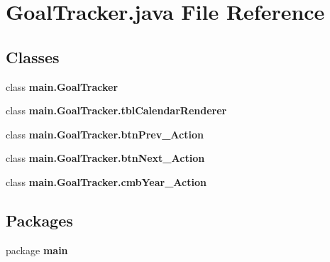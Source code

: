 \section{Goal\+Tracker.\+java File Reference}
\label{_goal_tracker_8java}
\subsection*{Classes}
\begin{DoxyCompactItemize}
\item 
class \textbf{ main.\+Goal\+Tracker}
\item 
class {\bfseries main.\+Goal\+Tracker.\+tbl\+Calendar\+Renderer}
\item 
class {\bfseries main.\+Goal\+Tracker.\+btn\+Prev\+\_\+\+Action}
\item 
class {\bfseries main.\+Goal\+Tracker.\+btn\+Next\+\_\+\+Action}
\item 
class {\bfseries main.\+Goal\+Tracker.\+cmb\+Year\+\_\+\+Action}
\end{DoxyCompactItemize}
\subsection*{Packages}
\begin{DoxyCompactItemize}
\item 
package \textbf{ main}
\end{DoxyCompactItemize}
